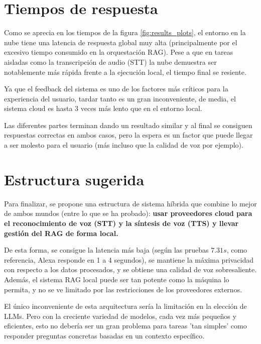 \documentclass[11pt,spanish,listoffigures,listoftables]{tfgetsinf}
\begin{document}
\section{Tiempos de respuesta}
Como se aprecia en los tiempos de la figura \ref{fig:results_plots}, el entorno en la nube tiene una latencia de respuesta global muy alta (principalmente por el excesivo tiempo consumido en la orquestación RAG). Pese a que en tareas aisladas como la transcripción de audio (STT) la nube demuestra ser notablemente más rápida frente a la ejecución local, el tiempo final se resiente. 

Ya que el feedback del sistema es uno de los factores más críticos para la experiencia del usuario, tardar tanto es un gran inconveniente, de media, el sistema cloud es hasta 3 veces más lento que en el entorno local. 

Las diferentes partes terminan dando un resultado similar y al final se consiguen respuestas correctas en ambos casos, pero la espera es un factor que puede llegar a ser molesto para el usuario (más incluso que la calidad de voz por ejemplo).


\section{Estructura sugerida}
Para finalizar, se propone una estructura de sistema híbrida que combine lo mejor de ambos mundos (entre lo que se ha probado): \textbf{usar proveedores cloud para el reconocimiento de voz (STT) y la síntesis de voz (TTS) y llevar gestión del RAG de forma local. }

De esta forma, se consigue la latencia más baja (según las pruebas $7.31s$, como referencia, Alexa responde en 1 a 4 segundos), se mantiene la máxima privacidad con respecto a los datos procesados, y se obtiene una calidad de voz sobresaliente. Además, el sistema RAG local puede ser tan potente como la máquina lo permita, y no se ve limitado por las restricciones de los proveedores externos.

El único inconveniente de esta arquitectura sería la limitación en la elección de LLMs. Pero con la creciente variedad de modelos, cada vez más pequeños y eficientes, esto no debería ser un gran problema para tareas 'tan simples' como responder preguntas concretas basadas en un contexto específico.

\end{document}
